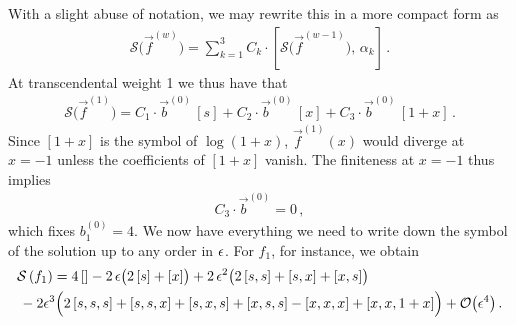 With a slight abuse of notation, we may rewrite this in a more compact form as
\begin{align}
\mathcal{S}\bigl( \vec{f}^{(w)} \bigr) = \sum_{k=1}^3 C_{k} \cdot \left[ \mathcal{S}\bigl(  \vec{f}^{(w-1)} \bigr) , \, \alpha_k \right] \,.
\end{align}
At transcendental weight 1 we thus have that
\begin{align}
\mathcal{S}\bigl(  \vec{f}^{(1)} \bigr)  = C_1 \cdot \vec{b}^{(0)} \, [s] + C_2 \cdot \vec{b}^{(0)} \, [x] +  C_3 \cdot \vec{b}^{(0)} \, [1 + x]  \,.
\end{align}
Since $[1+x]$ is the symbol of $\log(1+x)$, $\vec{f}^{(1)}(x)$ would diverge at $x=-1$ unless the coefficients of $[1+x]$ vanish. The finiteness at $x=-1$ thus implies
\begin{align}
C_3 \cdot \vec{b}^{(0)} = 0 \,,
\end{align}
which fixes $b_1^{(0)} = 4$. We now have everything we need to write down the symbol of the solution up to any order in $\epsilon$. For $f_1$, for instance, we obtain 
\begin{align} \begin{aligned}
& \mathcal{S}\left( f_1 \right) = 4 \, [] - 2 \, \epsilon \bigl( 2\, [s] + [x] \bigr)
  + 2 \, \epsilon^2 \bigl( 2 \, [s,s] + [s,x] + [x,s] \bigr) \\
& \, - 2 \epsilon^3 \Bigl( 2 \, [s,s,s] + [s,s,x] + [s,x,s] + [x,s,s] - [x,x,x]+[x,x,1+x] \Bigr) + \mathcal{O}\bigl(\epsilon^4\bigr) \,.
\end{aligned} \end{align}


